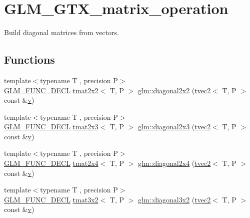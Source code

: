 \hypertarget{group__gtx__matrix__operation}{}\section{G\+L\+M\+\_\+\+G\+T\+X\+\_\+matrix\+\_\+operation}
\label{group__gtx__matrix__operation}


Build diagonal matrices from vectors.  


\subsection*{Functions}
\begin{DoxyCompactItemize}
\item 
{\footnotesize template$<$typename T , precision P$>$ }\\\mbox{\hyperlink{setup_8hpp_ab2d052de21a70539923e9bcbf6e83a51}{G\+L\+M\+\_\+\+F\+U\+N\+C\+\_\+\+D\+E\+CL}} \mbox{\hyperlink{structglm_1_1tmat2x2}{tmat2x2}}$<$ T, P $>$ \mbox{\hyperlink{group__gtx__matrix__operation_ga01dc503262dba9c457113d131fc8c024}{glm\+::diagonal2x2}} (\mbox{\hyperlink{structglm_1_1tvec2}{tvec2}}$<$ T, P $>$ const \&\mbox{\hyperlink{glad_8h_a14cfbe2fc2234f5504618905b69d1e06}{v}})
\item 
{\footnotesize template$<$typename T , precision P$>$ }\\\mbox{\hyperlink{setup_8hpp_ab2d052de21a70539923e9bcbf6e83a51}{G\+L\+M\+\_\+\+F\+U\+N\+C\+\_\+\+D\+E\+CL}} \mbox{\hyperlink{structglm_1_1tmat2x3}{tmat2x3}}$<$ T, P $>$ \mbox{\hyperlink{group__gtx__matrix__operation_ga763817f07d6a94b722a48adfa87a35db}{glm\+::diagonal2x3}} (\mbox{\hyperlink{structglm_1_1tvec2}{tvec2}}$<$ T, P $>$ const \&\mbox{\hyperlink{glad_8h_a14cfbe2fc2234f5504618905b69d1e06}{v}})
\item 
{\footnotesize template$<$typename T , precision P$>$ }\\\mbox{\hyperlink{setup_8hpp_ab2d052de21a70539923e9bcbf6e83a51}{G\+L\+M\+\_\+\+F\+U\+N\+C\+\_\+\+D\+E\+CL}} \mbox{\hyperlink{structglm_1_1tmat2x4}{tmat2x4}}$<$ T, P $>$ \mbox{\hyperlink{group__gtx__matrix__operation_ga49b37c819cf6dd8e35112ed1a13d45a3}{glm\+::diagonal2x4}} (\mbox{\hyperlink{structglm_1_1tvec2}{tvec2}}$<$ T, P $>$ const \&\mbox{\hyperlink{glad_8h_a14cfbe2fc2234f5504618905b69d1e06}{v}})
\item 
{\footnotesize template$<$typename T , precision P$>$ }\\\mbox{\hyperlink{setup_8hpp_ab2d052de21a70539923e9bcbf6e83a51}{G\+L\+M\+\_\+\+F\+U\+N\+C\+\_\+\+D\+E\+CL}} \mbox{\hyperlink{structglm_1_1tmat3x2}{tmat3x2}}$<$ T, P $>$ \mbox{\hyperlink{group__gtx__matrix__operation_ga586e1ced91fd8a7c414186a200f13532}{glm\+::diagonal3x2}} (\mbox{\hyperlink{structglm_1_1tvec2}{tvec2}}$<$ T, P $>$ const \&\mbox{\hyperlink{glad_8h_a14cfbe2fc2234f5504618905b69d1e06}{v}})

\end{DoxyCompactItemize}
